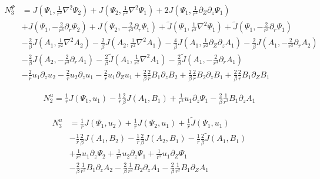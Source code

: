 \documentclass{paper}
\newcommand{\beq}{\begin{equation}}
\newcommand{\eeq}{\end{equation}}
\begin{document}
\beq
\begin{split}
N_3^{\Psi} & = J\left(\Psi_1, \frac{1}{r^2} \nabla^2 \Psi_2\right) + J\left(\Psi_2, \frac{1}{r^2} \nabla^2\Psi_1\right) + 2 J \left(\Psi_1, \frac{1}{r^2}\partial_Z\partial_z \Psi_1\right) \\
&+ J\left(\Psi_1, -\frac{2}{r^3}\partial_r \Psi_2\right) + J\left(\Psi_2, -\frac{2}{r^3}\partial_r \Psi_1\right) + \widetilde{J}\left(\Psi_1, \frac{1}{r^2} \nabla^2 \Psi_1\right) + \widetilde{J} \left(\Psi_1, -\frac{2}{r^3}\partial_r \Psi_1\right)\\
& - \frac{2}{\beta} J\left(A_1, \frac{1}{r^2}\nabla^2 A_2\right) - \frac{2}{\beta} J\left(A_2, \frac{1}{r^2}\nabla^2 A_1\right) - \frac{4}{\beta} J\left(A_1, \frac{1}{r^2}\partial_Z\partial_z A_1\right) - \frac{2}{\beta} J\left(A_1, -\frac{2}{r^3} \partial_r A_2 \right) \\
& - \frac{2}{\beta} J\left(A_2, -\frac{2}{r^3} \partial_r A_1\right) - \frac{2}{\beta} \widetilde{J} \left(A_1, \frac{1}{r^2} \nabla^2 A_1\right) - \frac{2}{\beta} \widetilde{J} \left(A_1, -\frac{2}{r^3} \partial_r A_1\right) \\
& - \frac{2}{r} u_1 \partial_z u_2 - \frac{2}{r} u_2 \partial_z u_1 - \frac{2}{r} u_1 \partial_Z u_1 + \frac{2}{\beta}\frac{2}{r} B_1\partial_z B_2 + \frac{2}{\beta}\frac{2}{r} B_2 \partial_z B_1 + \frac{2}{\beta} \frac{2}{r} B_1 \partial_Z B_1
\end{split}
\eeq

\beq
\begin{split}
N_2^{u} = \frac{1}{r} J\left(\Psi_1, u_1\right) - \frac{1}{r} \frac{2}{\beta} J\left(A_1, B_1\right) + \frac{1}{r^2} u_1 \partial_z \Psi_1 - \frac{2}{\beta}\frac{1}{r^2} B_1 \partial_z A_1
\end{split}
\eeq

\beq
\begin{split}
N_3^u & = \frac{1}{r}J\left(\Psi_1, u_2\right) + \frac{1}{r}J\left(\Psi_2, u_1\right) + \frac{1}{r}\widetilde{J} \left(\Psi_1, u_1\right) \\
& - \frac{1}{r}\frac{2}{\beta} J\left(A_1, B_2\right) - \frac{1}{r} \frac{2}{\beta} J\left(A_2, B_1\right) - \frac{1}{r}\frac{2}{\beta}\widetilde{J}\left(A_1, B_1\right) \\
& + \frac{1}{r^2} u_1\partial_z \Psi_2 + \frac{1}{r^2} u_2 \partial_z \Psi_1 + \frac{1}{r^2} u_1 \partial_Z \Psi_1 \\
& - \frac{2}{\beta} \frac{1}{r^2} B_1 \partial_z A_2 - \frac{2}{\beta} \frac{1}{r^2} B_2 \partial_z A_1 - \frac{2}{\beta} \frac{1}{r^2} B_1 \partial_Z A_1
\end{split}
\eeq
\end{document}
